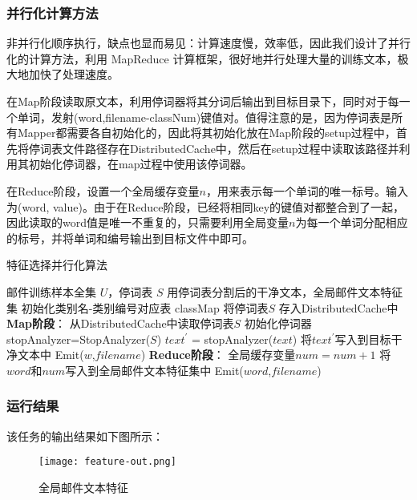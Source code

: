\documentclass[lang=cn,11pt]{elegantpaper}
\begin{document}
\subsubsection{并行化计算方法}
非并行化顺序执行，缺点也显而易见：计算速度慢，效率低，因此我们设计了并行化的计算方法，利用 MapReduce 计算框架，很好地并行处理大量的训练文本，极大地加快了处理速度。\par
在Map阶段读取原文本，利用停词器将其分词后输出到目标目录下，同时对于每一个单词，发射(word,filename-classNum)键值对。值得注意的是，因为停词表是所有Mapper都需要各自初始化的，因此将其初始化放在Map阶段的setup过程中，首先将停词表文件路径存在DistributedCache中，然后在setup过程中读取该路径并利用其初始化停词器，在map过程中使用该停词器。\par
在Reduce阶段，设置一个全局缓存变量$n$，用来表示每一个单词的唯一标号。输入为(word, value)。由于在Reduce阶段，已经将相同key的键值对都整合到了一起，因此读取的word值是唯一不重复的，只需要利用全局变量$n$为每一个单词分配相应的标号，并将单词和编号输出到目标文件中即可。\par
\begin{algorithm}[!htb]  
  \caption{特征选择并行化算法}  
  \label{alg:Framwork}
  \begin{algorithmic}[1]
    \Require
    邮件训练样本全集 $U$，停词表 $S$
    \Ensure 
    用停词表分割后的干净文本，全局邮件文本特征集
    \State 初始化类别名-类别编号对应表 classMap
    \State 将停词表$S$ 存入DistributedCache中
    \State \textbf{Map阶段}：
    \State 从DistributedCache中读取停词表$S$
    \State 初始化停词器 stopAnalyzer=StopAnalyzer($S$)
    \EndFunction
      \State $text^\prime$ = stopAnalyzer($text$)
      \State 将$text^\prime$写入到目标干净文本中
        \State Emit($w$,$filename$)
      \EndFor
    \EndFunction
    \State \textbf{Reduce阶段}：
      \State 全局缓存变量$num=num+1$
      \State 将$word$和$num$写入到全局邮件文本特征集中
      \State Emit($word$,$filename$)
    \EndFunction
  \end{algorithmic}
\end{algorithm}

\subsubsection{运行结果}
该任务的输出结果如下图所示：
\begin{figure}[!htbp]
	\centering
	\texttt{[image: feature-out.png]}
	\caption{全局邮件文本特征 \label{fig:feature-out}}
\end{figure}
\end{document}
